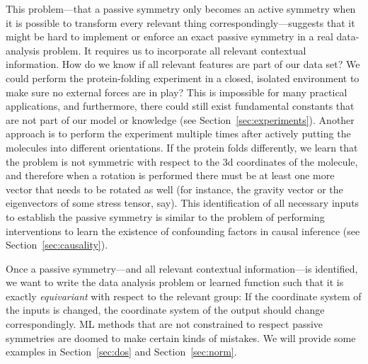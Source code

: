 \documentclass[accepted]{article}
\newcommand{\sectionname}{Section}
\newcommand{\secref}[1]{\sectionname~\ref{#1}}
\begin{document}
This problem---that a passive symmetry only becomes an active symmetry when it is possible to transform every relevant thing correspondingly---suggests that it might be hard to implement or enforce an exact passive symmetry in a real data-analysis problem.
It requires us to incorporate all relevant contextual information.
How do we know if all relevant features are part of our data set?
We could perform the protein-folding experiment in a closed, isolated environment to make sure no external forces are in play?
This is impossible for many practical applications, and furthermore, there could still exist fundamental constants that are not part of our model or knowledge (see \secref{sec:experiments}).
Another approach is to perform the experiment multiple times after actively putting the molecules into different orientations.
If the protein folds differently, we learn that the problem is not symmetric with respect to the 3d coordinates of the molecule, and therefore when a rotation is performed there must be at least one more vector that needs to be rotated as well (for instance, the gravity vector or the eigenvectors of some stress tensor, say).
This identification of all necessary inputs to establish the passive symmetry is similar to the problem of performing interventions to learn the existence of confounding factors in causal inference (see \secref{sec:causality}).

Once a passive symmetry---and all relevant contextual information---is identified, we want to write the data analysis problem or learned function such that it is exactly \emph{equivariant} with respect to the relevant group:
If the coordinate system of the inputs is changed, the coordinate system of the output should change correspondingly.
ML methods that are not constrained to respect passive symmetries are doomed to make certain kinds of mistakes.
We will provide some examples in \secref{sec:dos} and \secref{sec:norm}.
\end{document}
